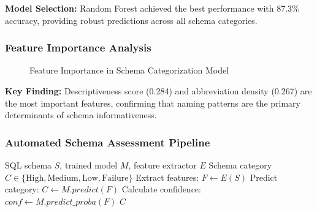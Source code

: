 \textbf{Model Selection:} Random Forest achieved the best performance with 87.3\% accuracy, providing robust predictions across all schema categories.

\subsubsection{Feature Importance Analysis}

\begin{figure}[H]
\centering
{}
\caption{Feature Importance in Schema Categorization Model}
\label{fig:feature_importance}
\end{figure}

\textbf{Key Finding:} Descriptiveness score (0.284) and abbreviation density (0.267) are the most important features, confirming that naming patterns are the primary determinants of schema informativeness.

\subsubsection{Automated Schema Assessment Pipeline}

\begin{algorithm}
\caption{Automated Schema Assessment Pipeline}
\begin{algorithmic}[1]
\Require SQL schema $S$, trained model $M$, feature extractor $E$
\Ensure Schema category $C \in \{\text{High}, \text{Medium}, \text{Low}, \text{Failure}\}$
\State Extract features: $F \leftarrow E(S)$
\State Predict category: $C \leftarrow M.predict(F)$
\State Calculate confidence: $conf \leftarrow M.predict\_proba(F)$
    \State \Return {} 
\Else
    \State \Return $C$
\EndIf
\end{algorithmic}
\end{algorithm}


